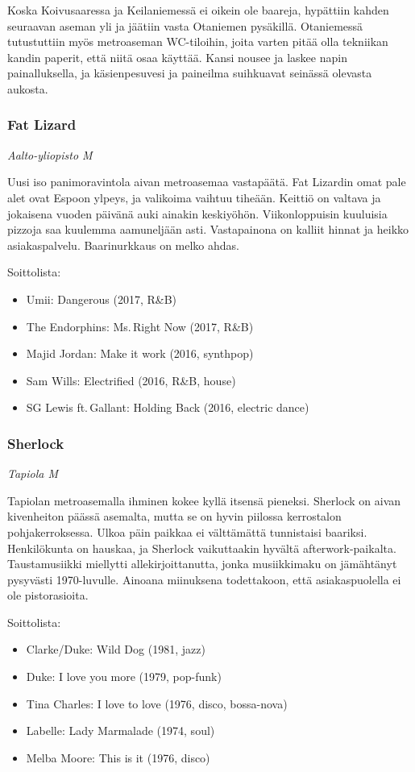 \documentclass[../ala_hataile.tex]{subfiles}
\begin{document}
Koska Koivu\-saaressa ja Keila\-niemessä ei oikein ole baareja, hypättiin kahden seuraavan aseman yli ja jäätiin vasta Ota\-niemen pysäkillä. Otaniemessä tutustuttiin myös metro\-aseman WC-tiloihin, joita varten pitää olla tekniikan kandin paperit, että niitä osaa käyttää. Kansi nousee ja laskee napin painalluksella, ja käsien\-pesu\-vesi ja paine\-ilma suihkuavat seinässä olevasta aukosta.

\subsubsection*{Fat Lizard}
\textit{Aalto-yliopisto M}

Uusi iso panimo\-ravintola aivan metro\-asemaa vasta\-päätä. Fat Lizardin omat pale alet ovat Espoon ylpeys, ja valikoima vaihtuu tiheään. Keittiö on valtava ja jokaisena vuoden päivänä auki ainakin keskiyöhön. Viikon\-loppuisin kuuluisia pizzoja saa kuulemma aamu\-neljään asti. Vasta\-painona on kalliit hinnat ja heikko asiakas\-palvelu. Baari\-nurkkaus on melko ahdas.

Soittolista:
\begin{itemize}
	\item Umii: Dangerous (2017, R\&B)
	\item The Endorphins: Ms.\,Right Now (2017, R\&B)
	\item Majid Jordan: Make it work (2016, synthpop)
	\item Sam Wills: Electrified (2016, R\&B, house)
	\item SG Lewis ft.\,Gallant: Holding Back (2016, electric dance)
\end{itemize}
\subsubsection*{Sherlock}
\textit{Tapiola M}

Tapiolan metro\-asemalla ihminen kokee kyllä itsensä pieneksi. Sherlock on aivan kiven\-heiton päässä asemalta, mutta se on hyvin piilossa kerros\-talon pohja\-kerroksessa. Ulkoa päin paikkaa ei välttämättä tunnistaisi baariksi. Henkilö\-kunta on hauskaa, ja Sherlock vaikuttaakin hyvältä after\-work-paikalta. Tausta\-musiikki miellytti alle\-kirjoittanutta, jonka musiikki\-maku on jämähtänyt pysyvästi 1970-luvulle. Ainoana miinuksena todettakoon, että asiakas\-puolella ei ole pisto\-rasioita.

Soittolista:
\begin{itemize}
	\item Clarke/Duke: Wild Dog (1981, jazz)
	\item Duke: I love you more (1979, pop-funk)
	\item Tina Charles: I love to love (1976, disco, bossa-nova)
	\item Labelle: Lady Marmalade (1974, soul)
	\item Melba Moore: This is it (1976, disco)
\end{itemize}
\end{document}
